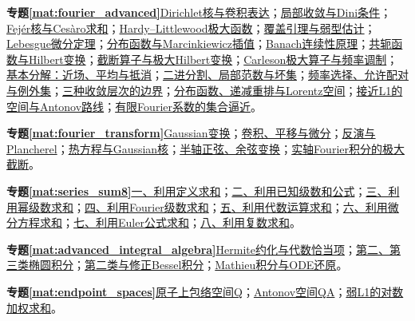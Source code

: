 \par\noindent\textbf{专题\ref{mat:fourier_advanced}}\quad \hyperref[mat:fourier_advanced:kernel]{Dirichlet核与卷积表达}；\hyperref[mat:fourier_advanced:localization]{局部收敛与Dini条件}；\hyperref[mat:fourier_advanced:fejer]{Fejér核与Cesàro求和}；\hyperref[mat:fourier_advanced:maximal]{Hardy--Littlewood极大函数}；\hyperref[mat:fourier_advanced:weak]{覆盖引理与弱型估计}；\hyperref[mat:fourier_advanced:differentiate]{Lebesgue微分定理}；\hyperref[mat:fourier_advanced:interpolation]{分布函数与Marcinkiewicz插值}；\hyperref[mat:fourier_advanced:banach]{Banach连续性原理}；\hyperref[mat:fourier_advanced:hilbert]{共轭函数与Hilbert变换}；\hyperref[mat:fourier_advanced:hilbertLp]{截断算子与极大Hilbert变换}；\hyperref[mat:fourier_advanced:carleson]{Carleson极大算子与频率调制}；\hyperref[mat:fourier_advanced:basicstep]{基本分解：近场、平均与抵消}；\hyperref[mat:fourier_advanced:dyadic]{二进分割、局部范数与坏集}；\hyperref[mat:fourier_advanced:selection]{频率选择、允许配对与例外集}；\hyperref[mat:fourier_advanced:convergence]{三种收敛层次的边界}；\hyperref[mat:fourier_advanced:rearrangement]{分布函数、递减重排与Lorentz空间}；\hyperref[mat:fourier_advanced:endpoint]{接近L1的空间与Antonov路线}；\hyperref[mat:fourier_advanced:antonov]{有限Fourier系数的集合逼近}。\par
\par\noindent\textbf{专题\ref{mat:fourier_transform}}\quad \hyperref[mat:fourier_transform:gaussian]{Gaussian变换}；\hyperref[mat:fourier_transform:convolution]{卷积、平移与微分}；\hyperref[mat:fourier_transform:plancherel]{反演与Plancherel}；\hyperref[mat:fourier_transform:heat]{热方程与Gaussian核}；\hyperref[mat:fourier_transform:sinecosine]{半轴正弦、余弦变换}；\hyperref[mat:fourier_transform:realmax]{实轴Fourier积分的极大截断}。\par
\par\noindent\textbf{专题\ref{mat:series_sum8}}\quad \hyperref[mat:series_sum8:j1]{一、利用定义求和}；\hyperref[mat:series_sum8:j2]{二、利用已知级数和公式}；\hyperref[mat:series_sum8:j3]{三、利用幂级数求和}；\hyperref[mat:series_sum8:j4]{四、利用Fourier级数求和}；\hyperref[mat:series_sum8:j5]{五、利用代数运算求和}；\hyperref[mat:series_sum8:j6]{六、利用微分方程求和}；\hyperref[mat:series_sum8:j7]{七、利用Euler公式求和}；\hyperref[mat:series_sum8:j8]{八、利用复数求和}。\par
\par\noindent\textbf{专题\ref{mat:advanced_integral_algebra}}\quad \hyperref[mat:advanced_integral_algebra:hermite]{Hermite约化与代数恰当项}；\hyperref[mat:advanced_integral_algebra:elliptic23]{第二、第三类椭圆积分}；\hyperref[mat:advanced_integral_algebra:modbessel]{第二类与修正Bessel积分}；\hyperref[mat:advanced_integral_algebra:mathieu]{Mathieu积分与ODE还原}。\par
\par\noindent\textbf{专题\ref{mat:endpoint_spaces}}\quad \hyperref[mat:endpoint_spaces:qspace]{原子上包络空间Q}；\hyperref[mat:endpoint_spaces:qaspace]{Antonov空间QA}；\hyperref[mat:endpoint_spaces:weakseries]{弱L1的对数加权求和}。\par




